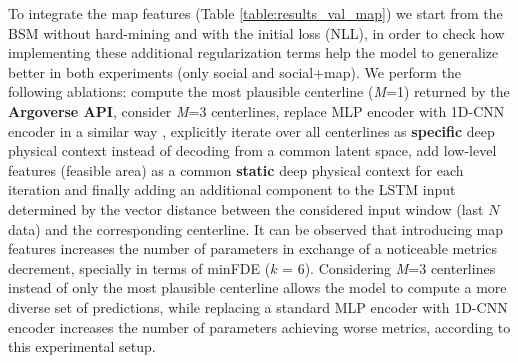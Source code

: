 To integrate the map features (Table \ref{table:results_val_map}) we start from the BSM without hard-mining and with the initial loss (NLL), in order to check how implementing these additional regularization terms help the model to generalize better in both experiments (only social and social+map). We perform the following ablations: compute the most plausible centerline (\textit{M}=1) returned by the \textbf{Argoverse API}, consider \textit{M}=3 centerlines, replace MLP encoder with 1D-CNN encoder in a similar way \cite{mercat2020multi}, explicitly iterate over all centerlines as \textbf{specific} deep physical context instead of decoding from a common latent space, add low-level features (feasible area) as a common \textbf{static} deep physical context for each iteration and finally adding an additional component to the LSTM input determined by the vector distance between the considered input window (last $N$ data) and the corresponding centerline. It can be observed that introducing map features increases the number of parameters in exchange of a noticeable metrics decrement, specially in terms of minFDE ($k$ = 6). Considering \textit{M}=3 centerlines instead of only the most plausible centerline allows the model to compute a more diverse set of predictions, while replacing a standard MLP encoder with 1D-CNN encoder increases the number of parameters achieving worse metrics, according to this experimental setup. 

